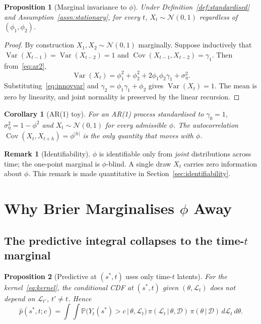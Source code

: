 \documentclass[11pt]{article}
\newtheorem{proposition}{Proposition}
\newtheorem{corollary}{Corollary}
\theoremstyle{definition}
\newtheorem{remark}{Remark}
\newcommand{\Var}{\operatorname{Var}}
\newcommand{\Cov}{\operatorname{Cov}}
\renewcommand{\Pr}{\mathbb{P}}
\newcommand{\Norm}{\mathcal{N}}
\newcommand{\D}{\mathcal{D}}
\newcommand{\Ltot}{\mathcal{L}}
\newcommand{\given}{\,\vert\,}
\begin{document}
\begin{proposition}[Marginal invariance to $\phi$]
\label{prop:invariance}
Under Definition~\ref{def:standardised} and
Assumption~\ref{assn:stationary}, for every $t$,
$X_t \sim \Norm(0, 1)$ regardless of $(\phi_1, \phi_2)$.
\end{proposition}

\begin{proof}
By construction $X_1, X_2 \sim \Norm(0, 1)$ marginally. Suppose
inductively that $\Var(X_{t-1}) = \Var(X_{t-2}) = 1$ and
$\Cov(X_{t-1}, X_{t-2}) = \gamma_1$. Then from~\eqref{eq:ar2},
\[
  \Var(X_t)
    = \phi_1^2 + \phi_2^2 + 2 \phi_1 \phi_2 \gamma_1 + \sigma_\eta^2.
\]
Substituting~\eqref{eq:innovvar} and
$\gamma_2 = \phi_1 \gamma_1 + \phi_2$ gives $\Var(X_t) = 1$. The mean
is zero by linearity, and joint normality is preserved by the linear
recursion.
\end{proof}

\begin{corollary}[AR(1) toy]
\label{cor:ar1}
For an AR(1) process standardised to $\gamma_0 = 1$,
$\sigma_\eta^2 = 1 - \phi^2$ and $X_t \sim \Norm(0, 1)$ for every
admissible $\phi$. The autocorrelation
$\Cov(X_t, X_{t+h}) = \phi^{|h|}$ is the only quantity that moves with
$\phi$.
\end{corollary}

\begin{remark}[Identifiability]
\label{rem:identifiability}
$\phi$ is identifiable only from \emph{joint} distributions across
time; the one-point marginal is $\phi$-blind. A single draw $X_t$
carries zero information about $\phi$. This remark is made quantitative
in Section~\ref{sec:identifiability}.
\end{remark}

\section{Why Brier Marginalises $\phi$ Away}
\label{sec:derivations}

\subsection{The predictive integral collapses to the time-$t$ marginal}

\begin{proposition}[Predictive at $(s^*, t)$ uses only time-$t$ latents]
\label{prop:kernel-decomposition}
For the kernel~\eqref{eq:kernel}, the conditional CDF at $(s^*, t)$
given $(\theta, \Ltot_t)$ does not depend on $\Ltot_{t'}$, $t' \ne t$.
Hence
\begin{equation}
  \hat p(s^*, t; c)
    = \int \!\!\int
        \Pr\!\big(Y_t(s^*) > c \given \theta, \Ltot_t\big) \,
        \pi(\Ltot_t \given \theta, \D) \,
        \pi(\theta \given \D) \, d\Ltot_t \, d\theta.
  \label{eq:predictive}
\end{equation}
\end{proposition}
\end{document}
